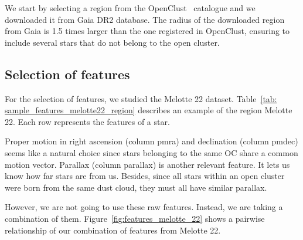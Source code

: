 \documentclass[11pt,a4paper,english,twocolumn]{article}
\begin{document}
We start by selecting a region from the OpenClust~\cite{dias2002new} catalogue and
we downloaded it from Gaia DR2 database. The radius of the downloaded region from Gaia
is 1.5 times larger than the one registered in OpenClust, ensuring to include several
stars that do not belong to the open cluster.

\subsection{Selection of features}
\label{sec:feature_selection}

For the selection of features, we studied the Melotte 22 dataset. Table~\ref{tab:
sample_features_melotte22_region} describes an example of the region Melotte 22. Each
row represents the features of a star.

\begin{table}[!htbp]
  \begin{center}
    \caption{Features of Melotte 22 region.}
    \label{tab:sample_features_melotte22_region}
  \end{center}
\end{table}

Proper motion in right ascension (column pmra) and declination (column pmdec) seems
like a natural choice since stars belonging to the same OC share a common motion vector.
Parallax (column parallax) is another relevant feature. It lets us know how far stars
are from us. Besides, since all stars within an open cluster were born from the same
dust cloud, they must all have similar parallax.

However, we are not going to use these raw features. Instead, we are taking a combination
of them. Figure~\ref{fig:features_melotte_22} shows a pairwise relationship of our
combination of features from Melotte 22.
\end{document}
